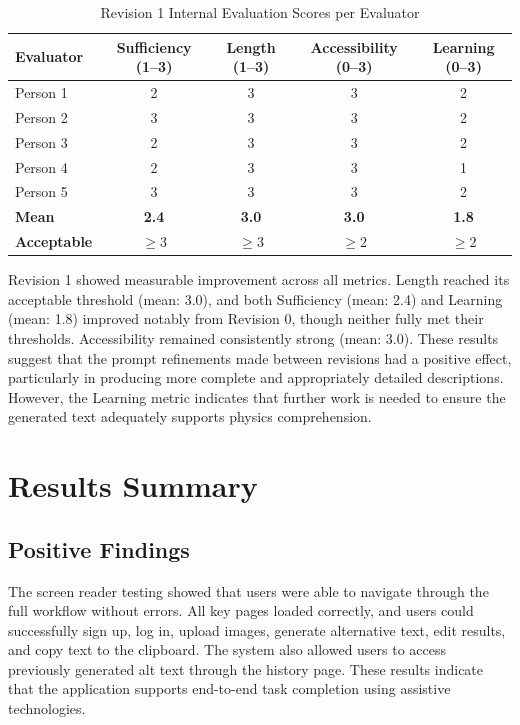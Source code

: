 \documentclass{article}
\begin{document}
\begin{table}[t]
\centering
\caption{Revision 1 Internal Evaluation Scores per Evaluator}
\label{tab:rev1}
\begin{tabular}{lcccc}
\toprule
\textbf{Evaluator} & \textbf{Sufficiency (1--3)} & \textbf{Length (1--3)} & \textbf{Accessibility (0--3)} & \textbf{Learning (0--3)} \\
\midrule
Person 1 & 2 & 3 & 3 & 2 \\
Person 2 & 3 & 3 & 3 & 2 \\
Person 3 & 2 & 3 & 3 & 2 \\
Person 4 & 2 & 3 & 3 & 1 \\
Person 5 & 3 & 3 & 3 & 2 \\
\midrule
\textbf{Mean}       & \textbf{2.4} & \textbf{3.0} & \textbf{3.0} & \textbf{1.8} \\
\textbf{Acceptable} & $\geq 3$     & $\geq 3$     & $\geq 2$     & $\geq 2$     \\
\bottomrule
\end{tabular}
\end{table}

Revision 1 showed measurable improvement across all metrics. Length reached its 
acceptable threshold (mean: 3.0), and both Sufficiency (mean: 2.4) and Learning 
(mean: 1.8) improved notably from Revision 0, though neither fully met their 
thresholds. Accessibility remained consistently strong (mean: 3.0). These results 
suggest that the prompt refinements made between revisions had a positive effect, 
particularly in producing more complete and appropriately detailed descriptions. 
However, the Learning metric indicates that further work is needed to ensure the 
generated text adequately supports physics comprehension.

\section{Results Summary}
\subsection{Positive Findings}
The screen reader testing showed that users were able to navigate through the full workflow without errors. All key pages loaded correctly, and users could successfully sign up, log in, upload images, generate alternative text, edit results, and copy text to the clipboard. The system also allowed users to access previously generated alt text through the history page. These results indicate that the application supports end-to-end task completion using assistive technologies.
\end{document}
